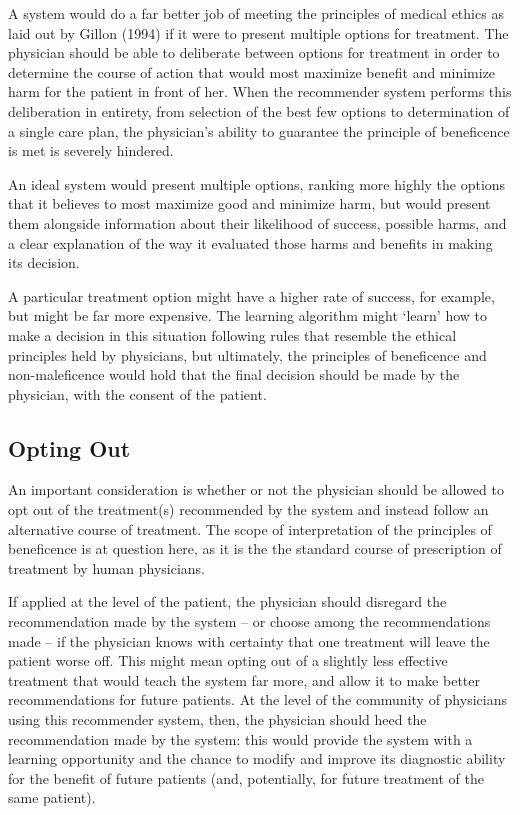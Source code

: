 \documentclass[]{spie}  %
\begin{document}
A system would do a far better job of meeting the principles of medical ethics as laid out by Gillon (1994) if it were to present multiple options for treatment. The physician should be able to deliberate between options for treatment in order to determine the course of action that would most maximize benefit and minimize harm for the patient in front of her. When the recommender system performs this deliberation in entirety, from selection of the best few options to determination of a single care plan, the physician’s ability to guarantee the principle of beneficence is met is severely hindered.

An ideal system would present multiple options, ranking more highly the options that it believes to most maximize good and minimize harm, but would present them alongside information about their likelihood of success, possible harms, and a clear explanation of the way it evaluated those harms and benefits in making its decision.

A particular treatment option might have a higher rate of success, for example, but might be far more expensive. The learning algorithm might ‘learn’ how to make a decision in this situation following rules that resemble the ethical principles held by physicians, but ultimately, the principles of beneficence and non-maleficence would hold that the final decision should be made by the physician, with the consent of the patient.

\subsection{Opting Out}

An important consideration is whether or not the physician should be allowed to opt out of the treatment(s) recommended by the system and instead follow an alternative course of treatment. The scope of interpretation of the principles of beneficence is at question here, as it is the the standard course of prescription of treatment by human physicians.

If applied at the level of the patient, the physician should disregard the recommendation made by the system -- or choose among the recommendations made -- if the physician knows with certainty that one treatment will leave the patient worse off. This might mean opting out of a slightly less effective treatment that would teach the system far more, and allow it to make better recommendations for future patients. At the level of the community of physicians using this recommender system, then, the physician should heed the recommendation made by the system: this would provide the system with a learning opportunity and the chance to modify and improve its diagnostic ability for the benefit of future patients (and, potentially, for future treatment of the same patient).
\end{document}

